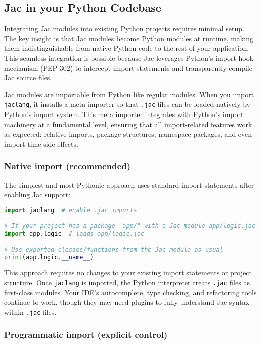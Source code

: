 \subsection{Jac in your Python Codebase}

Integrating Jac modules into existing Python projects requires minimal setup. The key insight is that Jac modules become Python modules at runtime, making them indistinguishable from native Python code to the rest of your application. This seamless integration is possible because Jac leverages Python's import hook mechanism (PEP 302) to intercept import statements and transparently compile Jac source files.

Jac modules are importable from Python like regular modules. When you import \texttt{jaclang}, it installs a meta importer so that \texttt{.jac} files can be loaded natively by Python's import system. This meta importer integrates with Python's import machinery at a fundamental level, ensuring that all import-related features work as expected: relative imports, package structures, namespace packages, and even import-time side effects.

\subsubsection{Native import (recommended)}

The simplest and most Pythonic approach uses standard import statements after enabling Jac support:

\begin{lstlisting}[language=Python]
import jaclang  # enable .jac imports

# If your project has a package "app/" with a Jac module app/logic.jac
import app.logic  # loads app/logic.jac

# Use exported classes/functions from the Jac module as usual
print(app.logic.__name__)
\end{lstlisting}

This approach requires no changes to your existing import statements or project structure. Once \texttt{jaclang} is imported, the Python interpreter treats \texttt{.jac} files as first-class modules. Your IDE's autocomplete, type checking, and refactoring tools continue to work, though they may need plugins to fully understand Jac syntax within \texttt{.jac} files.

\subsubsection{Programmatic import (explicit control)}

